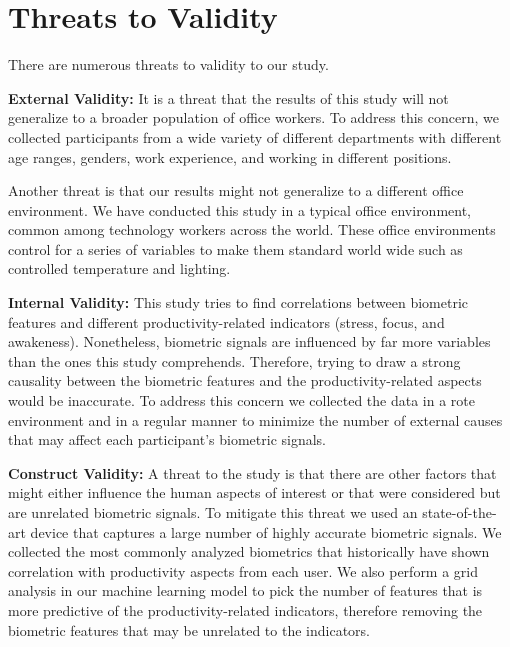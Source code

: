 \section{Threats to Validity}
There are numerous threats to validity to our study.

\textbf{External Validity:}
It is a threat that the results of this study
will not generalize to a broader population of office workers.
To address this concern, we collected participants
from a wide variety of different departments
with different age ranges, genders, work experience, and 
working in different positions.

Another threat is that our results might not generalize
to a different office environment. We have conducted
this study in a typical office environment, common
among technology workers across the world.
These office environments control for a series of
variables to make them standard world wide such
as controlled temperature and lighting.

\textbf{Internal Validity:}
This study tries to find correlations between
biometric features and different productivity-related indicators (stress, focus, and awakeness).
Nonetheless, biometric signals are influenced by far more
variables than the ones this study comprehends.
Therefore, trying to draw a strong causality between the biometric
features and the productivity-related aspects would be inaccurate.
To address this concern we collected the data
in a rote environment and in a regular manner 
to minimize the number of 
external causes that may affect each participant's
biometric signals.



\textbf{Construct Validity:}
A threat to the study is that
there are other factors that might either influence the
human aspects of interest or that were considered but
are unrelated biometric signals.
To mitigate this threat we used an state-of-the-art
device that captures a large number of highly accurate biometric
signals. We collected the most commonly analyzed
biometrics that historically have shown correlation with 
productivity aspects from each user.
We also perform a grid analysis in our machine learning model
to pick the number of features that is more predictive
of the productivity-related indicators, 
therefore removing the biometric
features that may be unrelated to the indicators.











